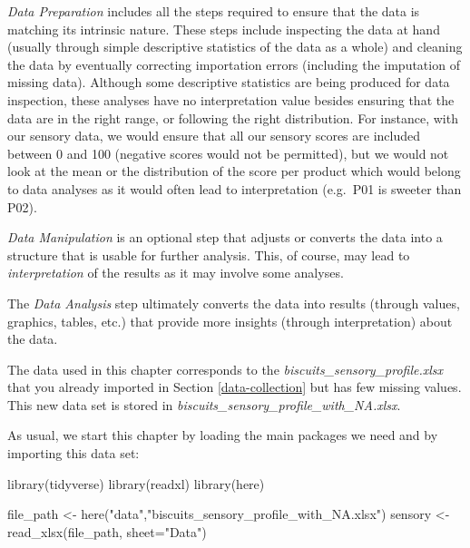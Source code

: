 \documentclass[
]{krantz}
\makeatletter
\newenvironment{Shaded}{\begin{snugshade}}{\end{snugshade}}
\newcommand{\AttributeTok}[1]{\textcolor[rgb]{0.61,0.61,0.61}{#1}}
\newcommand{\FunctionTok}[1]{\textcolor[rgb]{0,0,0}{#1}}
\newcommand{\NormalTok}[1]{#1}
\newcommand{\OtherTok}[1]{\textcolor[rgb]{0.37,0.37,0.37}{#1}}
\newcommand{\StringTok}[1]{\textcolor[rgb]{0.5,0.5,0.5}{#1}}
\newenvironment{kframe}{%
\medskip{}
\setlength{\fboxsep}{.8em}
 \def\at@end@of@kframe{}%
 \ifinner\ifhmode%
  \def\at@end@of@kframe{\end{minipage}}%
  \begin{minipage}{\columnwidth}%
 \fi\fi%
 \def\FrameCommand##1{\hskip\@totalleftmargin \hskip-\fboxsep
 \colorbox{shadecolor}{##1}\hskip-\fboxsep
     \hskip-\linewidth \hskip-\@totalleftmargin \hskip\columnwidth}%
 \MakeFramed {\advance\hsize-\width
   \@totalleftmargin\z@ \linewidth\hsize
   \@setminipage}}%
 {\par\unskip\endMakeFramed%
 \at@end@of@kframe}
\renewenvironment{Shaded}{\begin{kframe}}{\end{kframe}}
\makeatother
\begin{document}
\emph{Data Preparation} includes all the steps required to ensure that the data is matching its intrinsic nature. These steps include inspecting the data at hand (usually through simple descriptive statistics of the data as a whole) and cleaning the data by eventually correcting importation errors (including the imputation of missing data). Although some descriptive statistics are being produced for data inspection, these analyses have no interpretation value besides ensuring that the data are in the right range, or following the right distribution. For instance, with our sensory data, we would ensure that all our sensory scores are included between 0 and 100 (negative scores would not be permitted), but we would not look at the mean or the distribution of the score per product which would belong to data analyses as it would often lead to interpretation (e.g.~P01 is sweeter than P02).

\emph{Data Manipulation} is an optional step that adjusts or converts the data into a structure that is usable for further analysis. This, of course, may lead to \emph{interpretation} of the results as it may involve some analyses.

The \emph{Data Analysis} step ultimately converts the data into results (through values, graphics, tables, etc.) that provide more insights (through interpretation) about the data.

The data used in this chapter corresponds to the \emph{biscuits\_sensory\_profile.xlsx} that you already imported in Section \ref{data-collection} but has few missing values. This new data set is stored in \emph{biscuits\_sensory\_profile\_with\_NA.xlsx}.

As usual, we start this chapter by loading the main packages we need and by importing this data set:

\begin{Shaded}
\begin{Highlighting}[]
\FunctionTok{library}\NormalTok{(tidyverse)}
\FunctionTok{library}\NormalTok{(readxl)}
\FunctionTok{library}\NormalTok{(here)}

\NormalTok{file\_path }\OtherTok{\textless{}{-}} \FunctionTok{here}\NormalTok{(}\StringTok{"data"}\NormalTok{,}\StringTok{"biscuits\_sensory\_profile\_with\_NA.xlsx"}\NormalTok{)}
\NormalTok{sensory }\OtherTok{\textless{}{-}} \FunctionTok{read\_xlsx}\NormalTok{(file\_path, }\AttributeTok{sheet=}\StringTok{"Data"}\NormalTok{)}
\end{Highlighting}
\end{Shaded}
\end{document}
